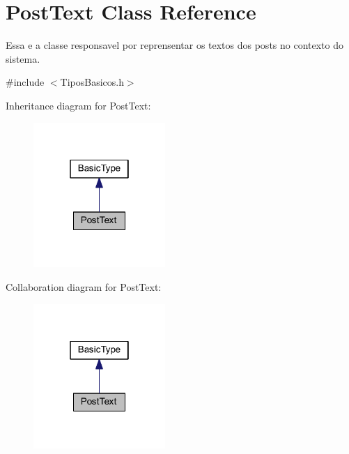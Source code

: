 \hypertarget{class_post_text}{\section{Post\-Text Class Reference}
\label{class_post_text}
}


Essa e a classe responsavel por reprensentar os textos dos posts no contexto do sistema.  




{\ttfamily \#include $<$Tipos\-Basicos.\-h$>$}



Inheritance diagram for Post\-Text\-:\nopagebreak
\begin{figure}[H]
\begin{center}
\leavevmode
\includegraphics[width=142pt]{class_post_text__inherit__graph}
\end{center}
\end{figure}


Collaboration diagram for Post\-Text\-:\nopagebreak
\begin{figure}[H]
\begin{center}
\leavevmode
\includegraphics[width=142pt]{class_post_text__coll__graph}
\end{center}
\end{figure}
